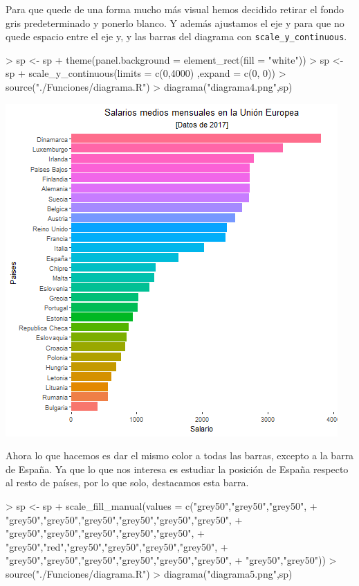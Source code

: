 \documentclass [a4paper] {article}
\begin{document}
\bigskip
Para que quede de una forma mucho más visual hemos decidido retirar el fondo gris predeterminado y ponerlo blanco.
Y además ajustamos el eje y para que no quede espacio entre el eje y, y las barras del diagrama con
\texttt{scale\_y\_continuous}.
\begin{Schunk}
\begin{Sinput}
> sp <- sp + theme(panel.background = element_rect(fill = "white"))
> sp <- sp + scale_y_continuous(limits = c(0,4000) ,expand = c(0, 0))
> source("./Funciones/diagrama.R")
> diagrama("diagrama4.png",sp)
\end{Sinput}
\end{Schunk}

\includegraphics[width=\textwidth]{diagrama4}

\bigskip
Ahora lo que hacemos es dar el mismo color a todas las barras, excepto a la barra de España. Ya que lo que nos interesa
es estudiar la posición de España respecto al resto de países, por lo que solo, destacamos esta barra.
\begin{Schunk}
\begin{Sinput}
> sp <- sp + scale_fill_manual(values = c("grey50","grey50","grey50",
+         "grey50","grey50","grey50","grey50","grey50","grey50",
+         "grey50","grey50","grey50","grey50","grey50",
+         "grey50","red","grey50","grey50","grey50","grey50",
+         "grey50","grey50","grey50","grey50","grey50","grey50",
+         "grey50","grey50"))
> source("./Funciones/diagrama.R")
> diagrama("diagrama5.png",sp)
\end{Sinput}
\end{Schunk}
\end{document}
